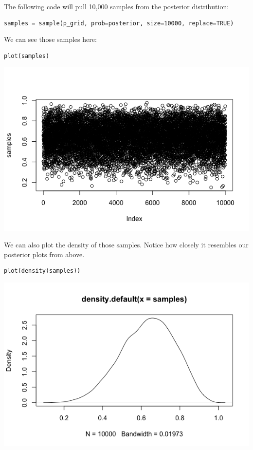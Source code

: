 \documentclass[11pt]{article}
\begin{document}
The following code will pull 10,000 samples from the posterior distribution:

\begin{verbatim}
samples = sample(p_grid, prob=posterior, size=10000, replace=TRUE)
\end{verbatim}

We can see those samples here:

\begin{verbatim}
plot(samples)
\end{verbatim}

\includegraphics[width=.9\linewidth]{figures/week9/samples.png}

We can also plot the density of those samples.  Notice how closely it resembles our posterior plots from above.

\begin{verbatim}
plot(density(samples))
\end{verbatim}

\includegraphics[width=.9\linewidth]{figures/week9/density.png}
\end{document}
